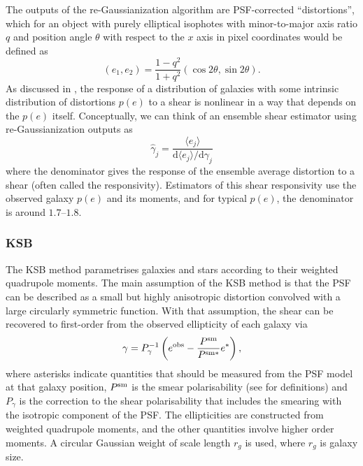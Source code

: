 \documentclass[iop]{emulateapj}
\begin{document}
The outputs of the re-Gaussianization algorithm are PSF-corrected ``distortions'', which for an
object with purely elliptical isophotes with minor-to-major axis ratio $q$ and position angle
$\theta$ with respect to the $x$ axis in pixel coordinates would be defined as
\begin{equation}
(e_1, e_2) = \frac{1-q^2}{1+q^2}\left(\cos{2\theta},\sin{2\theta}\right).
\end{equation}
As discussed in \cite{2002AJ....123..583B}, the response of a distribution of galaxies with some intrinsic
distribution of distortions $p(e)$ to a shear is nonlinear in a way that depends on the $p(e)$
itself.  Conceptually, we can think of an ensemble shear estimator using re-Gaussianization outputs
as
\begin{equation}
\hat{\gamma}_j = \frac{\langle e_j\rangle}{\mathrm{d}\langle e_j\rangle/\mathrm{d}\gamma_j}
\end{equation}
where the denominator gives the response of the ensemble average distortion to a shear (often called
the responsivity).  Estimators of this shear responsivity use the observed galaxy $p(e)$ and its
moments, and for typical $p(e)$, the denominator is around $1.7$--$1.8$.

\subsubsection{KSB}

The KSB method \citep{1995ApJ...449..460K} parametrises galaxies and stars according to their
weighted quadrupole moments.  The main assumption of the KSB method is that the PSF 
can be described as a small but highly anisotropic distortion
convolved with a large circularly symmetric function. 
With that assumption, the shear can be recovered to
first-order from the observed ellipticity of each galaxy via
\begin{equation} \label{eqn:weight}
\gamma=P_{\gamma}^{-1}\left(e^{\rm obs}-\frac{P^{\rm sm}}{P^{\rm sm*}}e^{*}\right),
\end{equation}
where asterisks indicate quantities that should be measured from the
PSF model at that galaxy position, $P^{\rm sm}$ is the
smear polarisability (see \citealt{2006MNRAS.368.1323H} for definitions) 
and $P_\gamma$ is the correction to the shear
polarisability that includes the smearing with the isotropic component
of the PSF. The ellipticities are constructed from 
weighted quadrupole moments, and the other quantities involve
higher order moments. A  circular Gaussian weight 
of scale length $r_g$ is used, where $r_g$ is galaxy
size.
\end{document}
